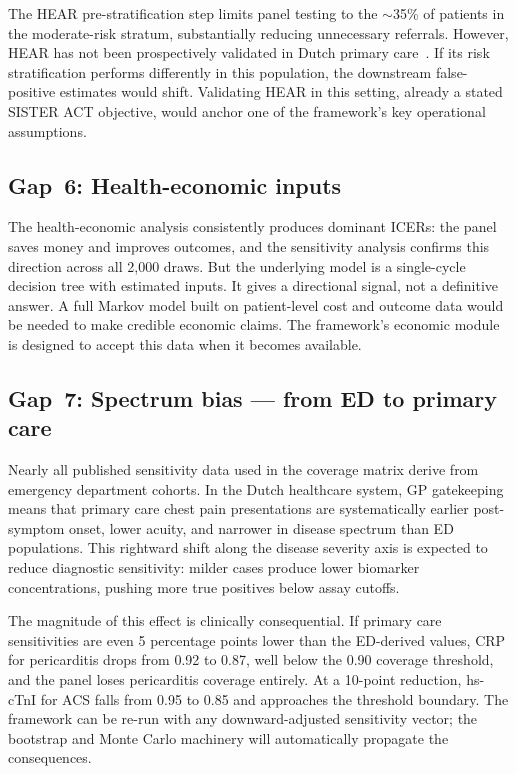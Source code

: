\documentclass[11pt, oneside]{article}
\begin{document}
The HEAR pre-stratification step limits panel testing to the $\sim$35\% of patients in the moderate-risk stratum, substantially reducing unnecessary referrals. However, HEAR has not been prospectively validated in Dutch primary care~\cite{VandenBulk2024}. If its risk stratification performs differently in this population, the downstream false-positive estimates would shift. Validating HEAR in this setting, already a stated SISTER ACT objective, would anchor one of the framework's key operational assumptions.

\subsection{Gap~6: Health-economic inputs}

The health-economic analysis consistently produces dominant ICERs: the panel saves money and improves outcomes, and the sensitivity analysis confirms this direction across all 2{,}000 draws. But the underlying model is a single-cycle decision tree with estimated inputs. It gives a directional signal, not a definitive answer. A full Markov model built on patient-level cost and outcome data would be needed to make credible economic claims. The framework's economic module is designed to accept this data when it becomes available.

\subsection{Gap~7: Spectrum bias --- from ED to primary care}

Nearly all published sensitivity data used in the coverage matrix derive from emergency department cohorts. In the Dutch healthcare system, GP gatekeeping means that primary care chest pain presentations are systematically earlier post-symptom onset, lower acuity, and narrower in disease spectrum than ED populations. This rightward shift along the disease severity axis is expected to reduce diagnostic sensitivity: milder cases produce lower biomarker concentrations, pushing more true positives below assay cutoffs.

The magnitude of this effect is clinically consequential. If primary care sensitivities are even 5 percentage points lower than the ED-derived values, CRP for pericarditis drops from 0.92 to 0.87, well below the 0.90 coverage threshold, and the panel loses pericarditis coverage entirely. At a 10-point reduction, hs-cTnI for ACS falls from 0.95 to 0.85 and approaches the threshold boundary. The framework can be re-run with any downward-adjusted sensitivity vector; the bootstrap and Monte Carlo machinery will automatically propagate the consequences.
\end{document}
